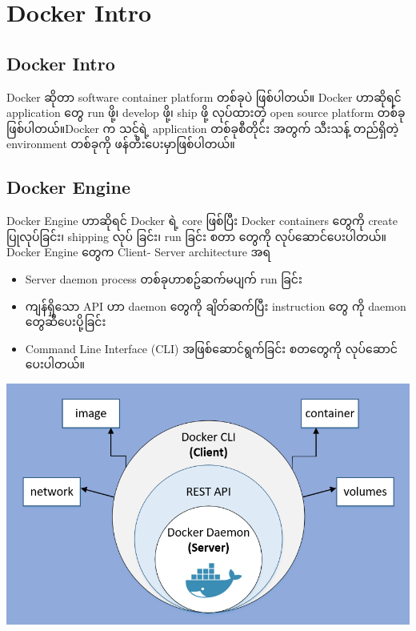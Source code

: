 \documentclass[]{article}
\date{}
\providecommand{\tightlist}{%
  \setlength{\itemsep}{0pt}\setlength{\parskip}{0pt}}
\begin{document}
\hypertarget{docker-intro}{%
\section{Docker Intro}\label{docker-intro}}

\hypertarget{docker-intro-1}{%
\subsection{Docker Intro}\label{docker-intro-1}}

Docker ဆိုတာ software container platform တစ်ခုပဲ ဖြစ်ပါတယ်။ Docker
ဟာဆိုရင် application ​တွေ run ဖို့၊ develop ဖို့၊ ship ဖို့ လုပ်ထားတဲ့
open source platform တစ်ခုဖြစ်ပါတယ်။Docker က သင့်ရဲ့ application
တစ်ခုစီတိုင်း အတွက် သီးသန့် တည်ရှိတဲ့ environment တစ်ခုကို
ဖန်တီး​ပေးမှာဖြစ်ပါတယ်။

\hypertarget{docker-engine}{%
\subsection{Docker Engine}\label{docker-engine}}

Docker Engine ဟာဆိုရင် Docker ရဲ့ core ဖြစ်ပြီး Docker containers
​တွေကို create ပြုလုပ်​ခြင်း၊ shipping လုပ် ခြင်း၊ run ခြင်း စတာ ​တွေကို
လုပ်​ဆောင်​ပေးပါတယ်။ Docker Engine ​တွေက Client- Server architecture အရ

\begin{itemize}
\tightlist
\item
  Server daemon process တစ်ခုဟာစဥ်ဆက်မပျက် run ခြင်း
\item
  ကျန်ရှိ​သော API ဟာ daemon ​တွေကို ချိတ်ဆက်ပြီး instruction ​တွေ ကို
  daemon ​တွေဆီ ​ပေးပို့ခြင်း
\item
  Command Line Interface (CLI) အဖြစ်​ဆောင်ရွက်ခြင်း စတ​တွေကို
  လုပ်​ဆောင်​ပေးပါတယ်။
\end{itemize}

\includegraphics{.gitbook/assets/screenshot-129.png}
\end{document}
